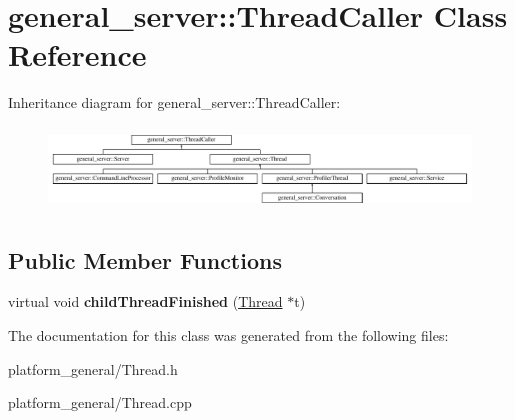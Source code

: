 \hypertarget{classgeneral__server_1_1ThreadCaller}{\section{general\-\_\-server\-:\-:\-Thread\-Caller \-Class \-Reference}
\label{classgeneral__server_1_1ThreadCaller}
}
\-Inheritance diagram for general\-\_\-server\-:\-:\-Thread\-Caller\-:\begin{figure}[H]
\begin{center}
\leavevmode
\includegraphics[height=2.240000cm]{classgeneral__server_1_1ThreadCaller}
\end{center}
\end{figure}
\subsection*{\-Public \-Member \-Functions}
\begin{DoxyCompactItemize}
\item 
\hypertarget{classgeneral__server_1_1ThreadCaller_ade0b15262c0353ca8db4c5a1192aeb15}{virtual void {\bfseries child\-Thread\-Finished} (\hyperlink{classgeneral__server_1_1Thread}{\-Thread} $\ast$t)}\label{classgeneral__server_1_1ThreadCaller_ade0b15262c0353ca8db4c5a1192aeb15}

\end{DoxyCompactItemize}


\-The documentation for this class was generated from the following files\-:\begin{DoxyCompactItemize}
\item 
platform\-\_\-general/\-Thread.\-h\item 
platform\-\_\-general/\-Thread.\-cpp\end{DoxyCompactItemize}
